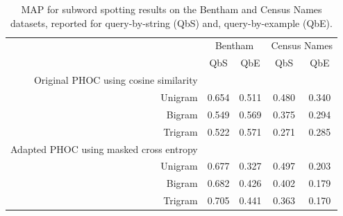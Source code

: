 \documentclass[ms,electronic,twosidetoc,letterpaper,chaptercenter,parttop,lof,lot]{byumsphd}
\begin{document}

\begin{table}
\centering
\begin{tabular}{| r | c c | c c |}
  \hline
   & \multicolumn{2}{c|}{Bentham} & \multicolumn{2}{c|}{Census Names}\\
   & QbS  & QbE    &  QbS &  QbE    \\
  \hline 
  Original PHOC using cosine similarity & & & & \\
  Unigram &  0.654 &  0.511  & 0.480 &  0.340 \\
  Bigram  &  0.549 &  0.569  & 0.375 &  0.294 \\
  Trigram &  0.522 &  0.571  & 0.271 &  0.285 \\
  \hline
  
  Adapted PHOC using masked cross entropy & & & & \\
  Unigram &  0.677 &  0.327  & 0.497 &  0.203 \\ 
  Bigram  &  0.682 &  0.426  & 0.402 &  0.179 \\
  Trigram &  0.705 &  0.441  & 0.363 &  0.170 \\
  \hline 
\end{tabular}
\caption{MAP for subword spotting results on the Bentham and Census Names datasets, reported for query-by-string (QbS) and, query-by-example (QbE).}
\label{tab:subwordspotting}
\end{table}
\end{document}

